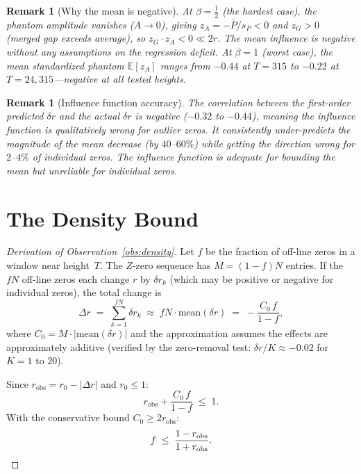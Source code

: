 \documentclass[11pt,a4paper]{article}
\newtheorem{remark}[theorem]{Remark}
\begin{document}
\begin{remark}[Why the mean is negative]
At $\beta = \frac{1}{2}$ (the hardest case), the phantom amplitude vanishes ($A \to 0$), giving $z_A = -\bar{P}/s_P < 0$ and $z_G > 0$ (merged gap exceeds average), so $z_G \cdot z_A < 0 \ll 2r$.
The mean influence is negative without any assumptions on the regression deficit.
At $\beta = 1$ (worst case), the mean standardized phantom $\mathbb{E}[z_A]$ ranges from $-0.44$ at $T = 315$ to $-0.22$ at $T = 24{,}315$---negative at all tested heights.
\end{remark}

\begin{remark}[Influence function accuracy]
The correlation between the first-order predicted $\delta r$ and the actual $\delta r$ is \emph{negative} ($-0.32$ to $-0.44$), meaning the influence function is qualitatively wrong for outlier zeros.
It consistently under-predicts the \emph{magnitude} of the mean decrease (by $40$--$60\%$) while getting the direction wrong for $2$--$4\%$ of individual zeros.
The influence function is adequate for bounding the mean but unreliable for individual zeros.
\end{remark}


\section{The Density Bound}\label{sec:density}

\begin{proof}[Derivation of Observation~\ref{obs:density}]
Let $f$ be the fraction of off-line zeros in a window near height~$T$.
The $Z$-zero sequence has $M = (1{-}f)N$ entries.
If the $fN$ off-line zeros each change $r$ by $\delta r_k$ (which may be positive or negative for individual zeros), the total change is
\[
\Delta r \;=\; \sum_{k=1}^{fN} \delta r_k \;\approx\; fN \cdot \mathrm{mean}(\delta r) \;=\; -\frac{C_0 \, f}{1-f},
\]
where $C_0 = M \cdot |\mathrm{mean}(\delta r)|$ and the approximation assumes the effects are approximately additive (verified by the zero-removal test: $\delta r / K \approx -0.02$ for $K = 1$ to $20$).

Since $r_{\mathrm{obs}} = r_0 - |\Delta r|$ and $r_0 \leq 1$:
\[
r_{\mathrm{obs}} + \frac{C_0 \, f}{1-f} \;\leq\; 1.
\]
With the conservative bound $C_0 \geq 2r_{\mathrm{obs}}$:
\[
f \;\leq\; \frac{1-r_{\mathrm{obs}}}{1+r_{\mathrm{obs}}}. \qedhere
\]
\end{proof}
\end{document}
